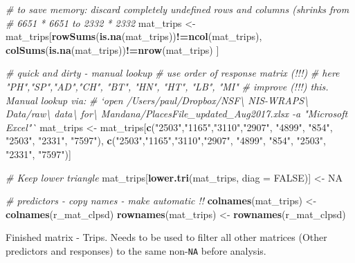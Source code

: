 \documentclass[]{article}
\newenvironment{Shaded}{\begin{snugshade}}{\end{snugshade}}
\newcommand{\KeywordTok}[1]{\textcolor[rgb]{0.13,0.29,0.53}{\textbf{#1}}}
\newcommand{\DataTypeTok}[1]{\textcolor[rgb]{0.13,0.29,0.53}{#1}}
\newcommand{\StringTok}[1]{\textcolor[rgb]{0.31,0.60,0.02}{#1}}
\newcommand{\CommentTok}[1]{\textcolor[rgb]{0.56,0.35,0.01}{\textit{#1}}}
\newcommand{\OtherTok}[1]{\textcolor[rgb]{0.56,0.35,0.01}{#1}}
\newcommand{\OperatorTok}[1]{\textcolor[rgb]{0.81,0.36,0.00}{\textbf{#1}}}
\newcommand{\NormalTok}[1]{#1}
\begin{document}
\begin{Shaded}
\begin{Highlighting}[]
\CommentTok{# to save memory: discard completely undefined rows and columns (shrinks from}
\CommentTok{#  6651 * 6651 to 2332 * 2332}
\NormalTok{mat_trips <-}\StringTok{ }\NormalTok{mat_trips[}\KeywordTok{rowSums}\NormalTok{(}\KeywordTok{is.na}\NormalTok{(mat_trips))}\OperatorTok{!=}\KeywordTok{ncol}\NormalTok{(mat_trips), }\KeywordTok{colSums}\NormalTok{(}\KeywordTok{is.na}\NormalTok{(mat_trips))}\OperatorTok{!=}\KeywordTok{nrow}\NormalTok{(mat_trips) ]}

\CommentTok{# quick and dirty - manual lookup}
\CommentTok{#   use order  of response matrix (!!!)}
\CommentTok{#   here "PH","SP","AD","CH", "BT", "HN", "HT", "LB", "MI"}
\CommentTok{#   improve (!!!) this. Manual lookup via:}
\CommentTok{#   `open /Users/paul/Dropbox/NSF\textbackslash{} NIS-WRAPS\textbackslash{} Data/raw\textbackslash{} data\textbackslash{} for\textbackslash{} Mandana/PlacesFile_updated_Aug2017.xlsx -a "Microsoft Excel"`}
\NormalTok{mat_trips <-}\StringTok{ }\NormalTok{mat_trips[}\KeywordTok{c}\NormalTok{(}\StringTok{"2503"}\NormalTok{,}\StringTok{"1165"}\NormalTok{,}\StringTok{"3110"}\NormalTok{,}\StringTok{"2907"}\NormalTok{, }\StringTok{"4899"}\NormalTok{, }\StringTok{"854"}\NormalTok{, }\StringTok{"2503"}\NormalTok{, }\StringTok{"2331"}\NormalTok{, }\StringTok{"7597"}\NormalTok{),}
                       \KeywordTok{c}\NormalTok{(}\StringTok{"2503"}\NormalTok{,}\StringTok{"1165"}\NormalTok{,}\StringTok{"3110"}\NormalTok{,}\StringTok{"2907"}\NormalTok{, }\StringTok{"4899"}\NormalTok{, }\StringTok{"854"}\NormalTok{, }\StringTok{"2503"}\NormalTok{, }\StringTok{"2331"}\NormalTok{, }\StringTok{"7597"}\NormalTok{)] }

\CommentTok{# Keep lower triangle}
\NormalTok{mat_trips[}\KeywordTok{lower.tri}\NormalTok{(mat_trips, }\DataTypeTok{diag =} \OtherTok{FALSE}\NormalTok{)] <-}\StringTok{ }\OtherTok{NA}

\CommentTok{# predictors - copy names - make automatic !! }
\KeywordTok{colnames}\NormalTok{(mat_trips) <-}\StringTok{ }\KeywordTok{colnames}\NormalTok{(r_mat_clpsd)}
\KeywordTok{rownames}\NormalTok{(mat_trips) <-}\StringTok{ }\KeywordTok{rownames}\NormalTok{(r_mat_clpsd)}
\end{Highlighting}
\end{Shaded}

Finished matrix - Trips. Needs to be used to filter all other matrices
(Other predictors and responses) to the same non-\texttt{NA} before
analysis.
\end{document}
